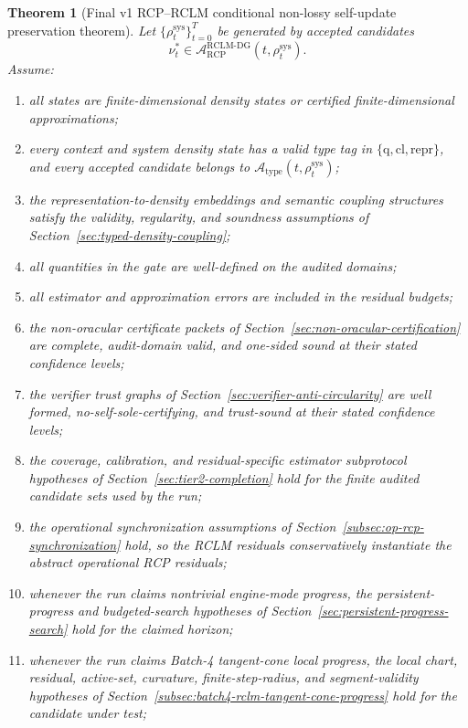 \documentclass[11pt,a4paper]{article}
\newtheorem{theorem}{Theorem}[section]
\newcommand{\Acal}{\mathcal A}
\newcommand{\RCP}{\mathrm{RCP}}
\newcommand{\RCLM}{\mathrm{RCLM}}
\newcommand{\DG}{\mathrm{DG}}
\newcommand{\sys}{\mathrm{sys}}
\newcommand{\qtype}{\mathrm{q}}
\newcommand{\cltype}{\mathrm{cl}}
\newcommand{\reptype}{\mathrm{repr}}
\begin{document}
\begin{theorem}[Final v1 RCP--RCLM conditional non-lossy self-update preservation theorem]
\label{thm:final-rclm-inheritance}
Let \(\{\rho_t^{\sys}\}_{t=0}^{T}\) be generated by accepted candidates
\[
\nu_t^*\in\Acal_{\RCP}^{\RCLM\text{-}\DG}(t,\rho_t^{\sys}).
\]
Assume:
\begin{enumerate}[label=(\alph*),leftmargin=1.5em]
    \item all states are finite-dimensional density states or certified finite-dimensional approximations;
    \item every context and system density state has a valid type tag in \(\{\qtype,\cltype,\reptype\}\), and every accepted candidate belongs to \(\Acal_{\mathrm{type}}(t,\rho_t^{\sys})\);
    \item the representation-to-density embeddings and semantic coupling structures satisfy the validity, regularity, and soundness assumptions of Section~\ref{sec:typed-density-coupling};
    \item all quantities in the gate are well-defined on the audited domains;
    \item all estimator and approximation errors are included in the residual budgets;
    \item the non-oracular certificate packets of Section~\ref{sec:non-oracular-certification} are complete, audit-domain valid, and one-sided sound at their stated confidence levels;
    \item the verifier trust graphs of Section~\ref{sec:verifier-anti-circularity} are well formed, no-self-sole-certifying, and trust-sound at their stated confidence levels;
    \item the coverage, calibration, and residual-specific estimator subprotocol hypotheses of Section~\ref{sec:tier2-completion} hold for the finite audited candidate sets used by the run;
    \item the operational synchronization assumptions of Section~\ref{subsec:op-rcp-synchronization} hold, so the RCLM residuals conservatively instantiate the abstract operational RCP residuals;
    \item whenever the run claims nontrivial engine-mode progress, the persistent-progress and budgeted-search hypotheses of Section~\ref{sec:persistent-progress-search} hold for the claimed horizon;
    \item whenever the run claims Batch-4 tangent-cone local progress, the local chart, residual, active-set, curvature, finite-step-radius, and segment-validity hypotheses of Section~\ref{subsec:batch4-rclm-tangent-cone-progress} hold for the candidate under test;

\end{enumerate}
\end{theorem}
\end{document}
